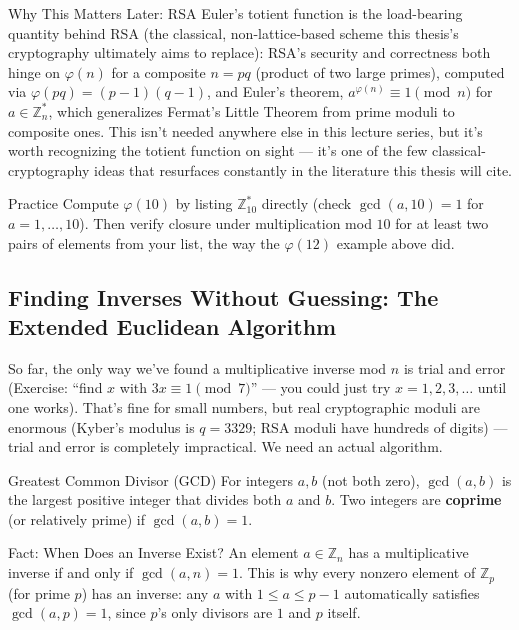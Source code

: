 \begin{previewbox}{Why This Matters Later: RSA}
Euler's totient function is the load-bearing quantity behind RSA (the classical, non-lattice-based scheme this thesis's cryptography ultimately aims to replace): RSA's security and correctness both hinge on $\varphi(n)$ for a composite $n=pq$ (product of two large primes), computed via $\varphi(pq)=(p-1)(q-1)$, and Euler's theorem, $a^{\varphi(n)}\equiv 1\pmod n$ for $a\in\mathbb{Z}_n^*$, which generalizes Fermat's Little Theorem from prime moduli to composite ones. This isn't needed anywhere else in this lecture series, but it's worth recognizing the totient function on sight --- it's one of the few classical-cryptography ideas that resurfaces constantly in the literature this thesis will cite.
\end{previewbox}

\begin{exercisebox}{Practice}
Compute $\varphi(10)$ by listing $\mathbb{Z}_{10}^*$ directly (check $\gcd(a,10)=1$ for $a=1,\ldots,10$). Then verify closure under multiplication mod $10$ for at least two pairs of elements from your list, the way the $\varphi(12)$ example above did.
\end{exercisebox}

\subsection{Finding Inverses Without Guessing: The Extended Euclidean Algorithm}
\label{sec:L1:finding-inverses-without-guessing-the-ex}

So far, the only way we've found a multiplicative inverse mod $n$ is trial and error (Exercise: ``find $x$ with $3x \equiv 1 \pmod 7$'' --- you could just try $x=1,2,3,\ldots$ until one works). That's fine for small numbers, but real cryptographic moduli are enormous (Kyber's modulus is $q=3329$; RSA moduli have hundreds of digits) --- trial and error is completely impractical. We need an actual algorithm.

\begin{defbox}{Greatest Common Divisor (GCD)}
For integers $a, b$ (not both zero), $\gcd(a,b)$ is the largest positive integer that divides both $a$ and $b$. Two integers are \textbf{coprime} (or relatively prime) if $\gcd(a,b) = 1$.
\end{defbox}

\begin{rmkbox}{Fact: When Does an Inverse Exist?}
An element $a \in \mathbb{Z}_n$ has a multiplicative inverse if and only if $\gcd(a,n) = 1$. This is why every nonzero element of $\mathbb{Z}_p$ (for prime $p$) has an inverse: any $a$ with $1 \le a \le p-1$ automatically satisfies $\gcd(a,p)=1$, since $p$'s only divisors are $1$ and $p$ itself.
\end{rmkbox}

